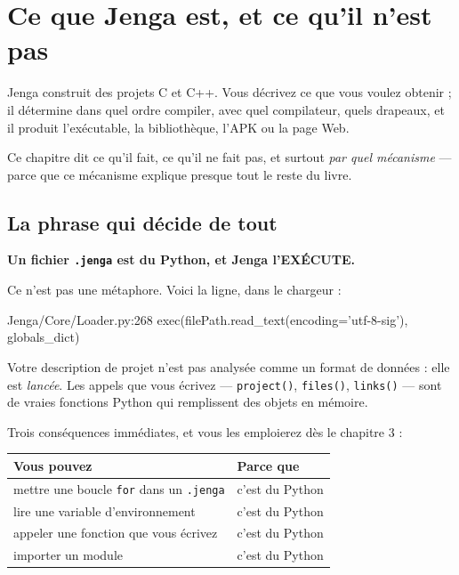 \chapter{Ce que Jenga est, et ce qu'il n'est pas}

Jenga construit des projets C et C++. Vous décrivez ce que vous voulez obtenir ;
il détermine dans quel ordre compiler, avec quel compilateur, quels drapeaux, et
il produit l'exécutable, la bibliothèque, l'APK ou la page Web.

Ce chapitre dit ce qu'il fait, ce qu'il ne fait pas, et surtout \emph{par quel
mécanisme} --- parce que ce mécanisme explique presque tout le reste du livre.

\section{La phrase qui décide de tout}

\begin{nkretenir}
\textbf{Un fichier \texttt{.jenga} est du Python, et Jenga l'EXÉCUTE.}

Ce n'est pas une métaphore. Voici la ligne, dans le chargeur :

\begin{nkcode}{Jenga/Core/Loader.py:268}
exec(filePath.read_text(encoding='utf-8-sig'), globals_dict)
\end{nkcode}

Votre description de projet n'est pas analysée comme un format de données : elle
est \emph{lancée}. Les appels que vous écrivez --- \texttt{project()},
\texttt{files()}, \texttt{links()} --- sont de vraies fonctions Python qui
remplissent des objets en mémoire.
\end{nkretenir}

Trois conséquences immédiates, et vous les emploierez dès le chapitre 3 :

\begin{center}
\begin{tabular}{@{}ll@{}}
\toprule
\textbf{Vous pouvez} & \textbf{Parce que} \\
\midrule
mettre une boucle \texttt{for} dans un \texttt{.jenga} & c'est du Python \\
lire une variable d'environnement & c'est du Python \\
appeler une fonction que vous écrivez & c'est du Python \\
importer un module & c'est du Python \\
\bottomrule
\end{tabular}
\end{center}

